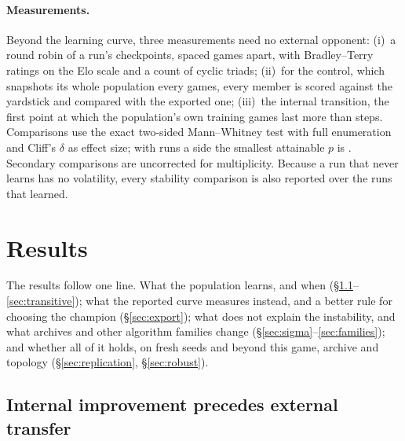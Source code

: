 \documentclass[11pt]{article}
\begin{document}
\paragraph{Measurements.}
Beyond the learning curve, three measurements need no external opponent:
(i)~a round robin of a run's checkpoints, spaced \nPopEvery{} games apart, with
Bradley--Terry ratings \citep{bradley1952rank} on the Elo scale and a count of
cyclic triads; (ii)~for the control, which snapshots its whole population every
\nPopEvery{} games, every member is scored against the yardstick and compared with
the exported one; (iii)~the internal transition, the first point at which the
population's own training games last more than \nLongRally{} steps. Comparisons use
the exact two-sided Mann--Whitney test with full enumeration
\citep{mann1947test} and Cliff's $\delta$ as effect size; with \nSeedsMain{} runs a
side the smallest attainable $p$ is \nMinPSix. Secondary comparisons are uncorrected for
multiplicity. Because a run that never learns has no volatility, every
stability comparison is also reported over the runs that learned.

\section{Results}
\label{sec:results}

The results follow one line. What the population learns, and when
(\S\ref{sec:lag}--\ref{sec:transitive}); what the reported curve measures instead,
and a better rule for choosing the champion (\S\ref{sec:export}); what does not
explain the instability, and what archives and other algorithm families change
(\S\ref{sec:sigma}--\ref{sec:families}); and whether all of it holds, on fresh
seeds and beyond this game, archive and topology
(\S\ref{sec:replication}, \S\ref{sec:robust}).

\begin{table}[!htbp]
\centering\small
\caption{Headline results. Points per episode against the 2015 policy, mean
$\pm$ s.e.m.\ across runs, held out. ``Learned to rally'': the population ever
held \nLongRally-step rallies against itself. The last two rows are the single run
on the unmodified environment and Ha's published value.}
\label{tab:headline}

\end{table}

\subsection{Internal improvement precedes external transfer}
\label{sec:lag}
\end{document}

